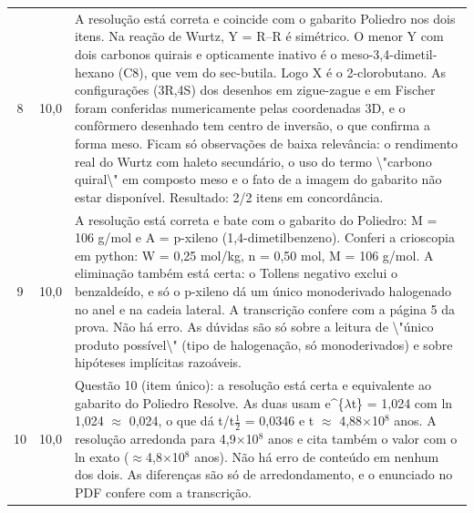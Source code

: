 \documentclass{article}%
\begin{document}
\begin{longtable}{@{}c c p{}@{}}
8 & 10,0 & A resolução está correta e coincide com o gabarito Poliedro nos dois itens. Na reação de Wurtz, Y = R--R é simétrico. O menor Y com dois carbonos quirais e opticamente inativo é o meso{-}3,4{-}dimetil{-}hexano (C8), que vem do sec{-}butila. Logo X é o 2{-}clorobutano. As configurações (3R,4S) dos desenhos em zigue{-}zague e em Fischer foram conferidas numericamente pelas coordenadas 3D, e o confôrmero desenhado tem centro de inversão, o que confirma a forma meso. Ficam só observações de baixa relevância: o rendimento real do Wurtz com haleto secundário, o uso do termo \textbackslash{}"carbono quiral\textbackslash{}" em composto meso e o fato de a imagem do gabarito não estar disponível. Resultado: 2/2 itens em concordância. \\
9 & 10,0 & A resolução está correta e bate com o gabarito do Poliedro: M = 106 g/mol e A = p{-}xileno (1,4{-}dimetilbenzeno). Conferi a crioscopia em python: W = 0,25 mol/kg, n = 0,50 mol, M = 106 g/mol. A eliminação também está certa: o Tollens negativo exclui o benzaldeído, e só o p{-}xileno dá um único monoderivado halogenado no anel e na cadeia lateral. A transcrição confere com a página 5 da prova. Não há erro. As dúvidas são só sobre a leitura de \textbackslash{}"único produto possível\textbackslash{}" (tipo de halogenação, só monoderivados) e sobre hipóteses implícitas razoáveis. \\
10 & 10,0 & Questão 10 (item único): a resolução está certa e equivalente ao gabarito do Poliedro Resolve. As duas usam e\^{}\{$\lambda$t\} = 1,024 com ln 1,024 $\approx$ 0,024, o que dá t/t$\frac12$ = 0,0346 e t $\approx$ 4,88$\times$10$^{8}$ anos. A resolução arredonda para 4,9$\times$10$^{8}$ anos e cita também o valor com o ln exato ($\approx$4,8$\times$10$^{8}$ anos). Não há erro de conteúdo em nenhum dos dois. As diferenças são só de arredondamento, e o enunciado no PDF confere com a transcrição. \\
\bottomrule\end{longtable}%
\end{document}
